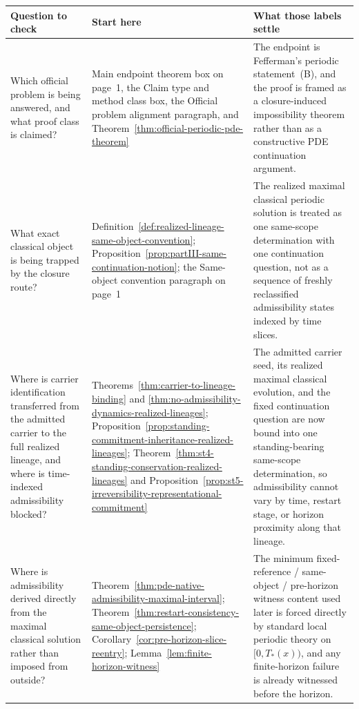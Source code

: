 \begin{tcolorbox}[title={Theorem map for a first audit pass}, colback=blue!2!white, colframe=blue!55!black, boxsep=1pt, left=2pt, right=2pt, top=2pt, bottom=2pt]
\scriptsize
\renewcommand{\arraystretch}{1.08}
\setlength{\tabcolsep}{3pt}
\begin{tabularx}{\textwidth}{@{}L{0.28\textwidth}L{0.32\textwidth}Y@{}}
\toprule
\textbf{Question to check} & \textbf{Start here} & \textbf{What those labels settle}\\
\midrule
Which official problem is being answered, and what proof class is claimed? & Main endpoint theorem box on page~1, the Claim type and method class box, the Official problem alignment paragraph, and Theorem~\ref{thm:official-periodic-pde-theorem} & The endpoint is Fefferman's periodic statement~(B), and the proof is framed as a closure-induced impossibility theorem rather than as a constructive PDE continuation argument.\\
What exact classical object is being trapped by the closure route? & Definition~\ref{def:realized-lineage-same-object-convention}; Proposition~\ref{prop:partIII-same-continuation-notion}; the Same-object convention paragraph on page~1 & The realized maximal classical periodic solution is treated as one same-scope determination with one continuation question, not as a sequence of freshly reclassified admissibility states indexed by time slices.\\
Where is carrier identification transferred from the admitted carrier to the full realized lineage, and where is time-indexed admissibility blocked? & Theorems~\ref{thm:carrier-to-lineage-binding} and \ref{thm:no-admissibility-dynamics-realized-lineages}; Proposition~\ref{prop:standing-commitment-inheritance-realized-lineages}; Theorem~\ref{thm:st4-standing-conservation-realized-lineages} and Proposition~\ref{prop:st5-irreversibility-representational-commitment} & The admitted carrier seed, its realized maximal classical evolution, and the fixed continuation question are now bound into one standing-bearing same-scope determination, so admissibility cannot vary by time, restart stage, or horizon proximity along that lineage.\\
Where is admissibility derived directly from the maximal classical solution rather than imposed from outside? & Theorem~\ref{thm:pde-native-admissibility-maximal-interval}; Theorem~\ref{thm:restart-consistency-same-object-persistence}; Corollary~\ref{cor:pre-horizon-slice-reentry}; Lemma~\ref{lem:finite-horizon-witness} & The minimum fixed-reference / same-object / pre-horizon witness content used later is forced directly by standard local periodic theory on $[0,T_*(x))$, and any finite-horizon failure is already witnessed before the horizon.\\

\end{tabularx}
\end{tcolorbox}

